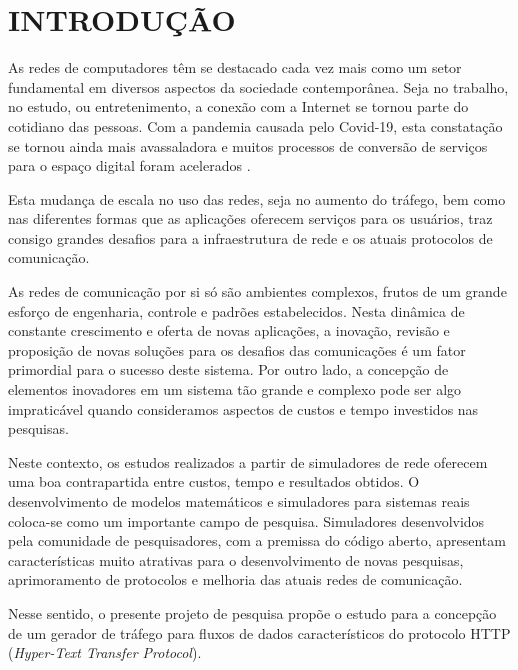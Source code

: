 \section{INTRODUÇÃO}
As redes de computadores têm se destacado cada vez mais como um setor fundamental em diversos aspectos da sociedade contemporânea. Seja no trabalho, no estudo, ou entretenimento, a conexão com a Internet se tornou parte do cotidiano das pessoas. Com a pandemia causada pelo Covid-19, esta constatação se tornou ainda mais avassaladora e muitos processos de conversão de serviços para o espaço digital foram acelerados \cite{Lavado2020} \cite{Johnson2021}.

Esta mudança de escala no uso das redes, seja no aumento do tráfego, bem como nas diferentes formas que as aplicações oferecem serviços para os usuários, traz consigo grandes desafios para a infraestrutura de rede e os atuais protocolos de comunicação.

As redes de comunicação por si só são ambientes complexos, frutos de um grande esforço de engenharia, controle e padrões estabelecidos. Nesta dinâmica de constante crescimento e oferta de novas aplicações, a inovação, revisão e proposição de novas soluções para os desafios das comunicações é um fator primordial para o sucesso deste sistema. Por outro lado, a concepção de elementos inovadores em um sistema tão grande e complexo pode ser algo impraticável quando consideramos aspectos de custos e tempo investidos nas pesquisas.

Neste contexto, os estudos realizados a partir de simuladores de rede oferecem uma boa contrapartida entre custos, tempo e resultados obtidos. O desenvolvimento de modelos matemáticos e simuladores para sistemas reais coloca-se como um importante campo de pesquisa. Simuladores desenvolvidos pela comunidade de pesquisadores, com a premissa do código aberto, apresentam características muito atrativas para o desenvolvimento de novas pesquisas, aprimoramento de protocolos e melhoria das atuais redes de comunicação.

Nesse sentido, o presente projeto de pesquisa propõe o estudo para a concepção de um gerador de tráfego para fluxos de dados característicos do protocolo HTTP (\textit{Hyper-Text Transfer Protocol}). 